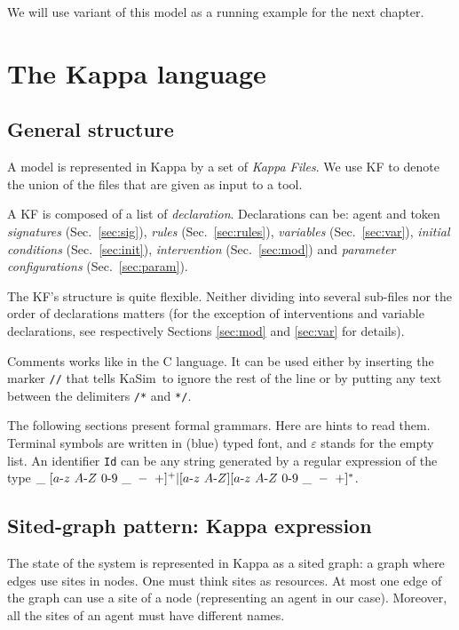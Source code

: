 \documentclass[11pt]{book}
\def\KaSim{\textsf{KaSim}}
\def\sep{\hbox{-}}
\def\ttt#1{\texttt{#1}}
\begin{document}
We will use variant of this model as a running example for the next chapter.

\chapter{The Kappa language}\label{chap:kappa}

\section{General structure}
A model is represented in Kappa by a set of \emph{Kappa Files}. We use
KF to denote the union of the files that are given
as input to a tool.

A KF is composed of a list of
\emph{declaration}.
Declarations can be: agent and token \emph{signatures}
(Sec.~\ref{sec:sig}), \emph{rules} (Sec.~\ref{sec:rules}),
\emph{variables} (Sec.~\ref{sec:var}), \emph{initial
  conditions} (Sec.~\ref{sec:init}),
\emph{intervention} (Sec.~\ref{sec:mod}) and
\emph{parameter configurations} (Sec.~\ref{sec:param}).

The KF's structure is quite flexible. Neither
dividing into several sub-files nor the order of
declarations matters (for the exception of
interventions and variable declarations, see
respectively Sections \ref{sec:mod} and \ref{sec:var} for details).

Comments works like in the C language. It can be used
either by inserting the marker \ttt{//} that tells \KaSim~to ignore
the rest of the line or by putting any text between the delimiters
\ttt{/*} and \ttt{*/}.

The following sections present formal grammars. Here are hints to read
them.  Terminal symbols are written in (blue) typed font, and
$\varepsilon$ stands for the empty list. An identifier \ttt{Id} can be
any string generated by a regular expression of the type
$\_\ [a\sep z\ A \sep Z\ 0\sep 9\ \_\ -\ +]^+ |
[ a\sep z\ A\sep Z][a\sep z\ A \sep Z\ 0\sep 9\ \_\ -\ +]^*$.

\section{Sited-graph pattern: Kappa expression}

The state of the system is represented in Kappa as a sited graph: a
graph where edges use sites in nodes. One must think sites as
resources. At most one edge of the graph can use a site of a node
(representing an agent in our case). Moreover, all the sites of an
agent must have different names.
\end{document}

